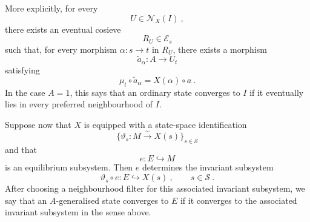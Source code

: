 \documentclass[a4paper,reqno,oneside]{amsart}
\theoremstyle{definition}
\theoremstyle{remark}
\renewcommand{\theta}{\vartheta}
\numberwithin{equation}{section}
\begin{document}
	
	More explicitly, for every
	\begin{equation}
		U\in\mathcal N_X(I) \ ,
	\end{equation}
	there exists an eventual cosieve
	\begin{equation}
		R_U\in\mathcal E_s
	\end{equation}
	such that, for every morphism $\alpha\colon s\to t$ in $R_U$, there exists a morphism
	\begin{equation}
		\widetilde a_\alpha\colon A\to U_t
	\end{equation}
	satisfying
	\begin{equation}
		\mu_t\circ \widetilde a_\alpha
		=
		X(\alpha)\circ a \ .
	\end{equation}
	In the case $A=1$, this says that an ordinary state converges to $I$ if it eventually lies in every preferred neighbourhood of $I$.
	
	Suppose now that $X$ is equipped with a state-space identification
	\begin{equation}
		\{\theta_s\colon M\xrightarrow{\sim}X(s)\}_{s\in\mathcal S}
	\end{equation}
	and that
	\begin{equation}
		e\colon E\hookrightarrow M
	\end{equation}
	is an equilibrium subsystem. Then $e$ determines the invariant subsystem
	\begin{equation}
		\theta_s\circ e\colon E\hookrightarrow X(s) \ ,
		\qquad s\in\mathcal S \ .
	\end{equation}
	After choosing a neighbourhood filter for this associated invariant
	subsystem, we say that an $A$-generalised state converges to $E$ if it converges to the associated invariant subsystem in the sense above.
	
	
	
	
	
\end{document}
